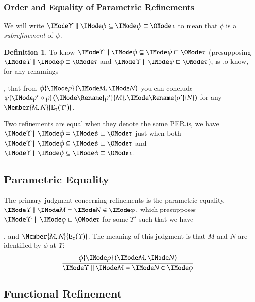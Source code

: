 \documentclass[11pt]{article}
\theoremstyle{definition}
\newtheorem{definition}[thm]{Definition}
\theoremstyle{notation}
\theoremstyle{remark}
\numberwithin{equation}{section}
\newcommand\Exprs{\mathbf{E}}
\begin{document}
\subsubsection{Order and Equality of Parametric Refinements}

We will write $\IsSubrefinement{\Upsilon}{\phi}{\psi}{\tau}$ to mean that $\phi$ is
a \emph{subrefinement} of $\psi$.

\begin{definition}

  To know $\IsSubrefinement{\Upsilon}{\phi}{\psi}{\tau}$ (presupposing
  $\Refines{\Upsilon}{\phi}{\tau}$ and $\Refines{\Upsilon}{\psi}{\tau}$), is
  to know, for any renamings
  , that from $\RefEquate{\phi}{\rho}{M}{N}$ you can conclude
  $\RefEquate{\psi}{\rho'\circ\rho}{\Rename{\rho'}{M}}{\Rename{\rho'}{N}}$ for any
  $\Member{M,N}{\Exprs_\tau(\Upsilon')}$.

\end{definition}

Two refinements are equal when they denote the same PER.\@That is, we have
$\EqRefines{\Upsilon}{\phi}{\psi}{\tau}$ just when both
$\IsSubrefinement{\Upsilon}{\phi}{\psi}{\tau}$ and
$\IsSubrefinement{\Upsilon}{\psi}{\phi}{\tau}$.

\subsection{Parametric Equality}

The primary judgment concerning refinements is the parametric equality,
$\RMemEq{\Upsilon}{M}{N}{\phi}$, which presupposes
$\Refines{\Upsilon'}{\phi}{\tau}$ for some $\Upsilon'$ such that we have
, and $\Member{M,N}{\Exprs_\tau(\Upsilon)}$. The meaning of this judgment is
that $M$ and $N$ are identified by $\phi$ at $\Upsilon$:
\[
  \infer{
    \RMemEq{\Upsilon}{M}{N}{\phi}
  }{
    \RefEquate{\phi}{\rho}{M}{N}
  }
\]

\subsection{Functional Refinement}
\end{document}
